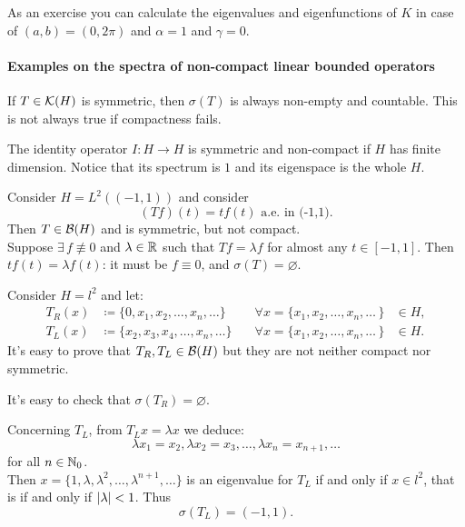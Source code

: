 As an exercise you can calculate the eigenvalues and eigenfunctions of $K$ in case of $(a,b)=(0, 2\pi)$ and $\alpha = 1$ and $\gamma = 0$.


\paragraph{Examples on the spectra of non-compact linear bounded operators}
If $T \in \mathcal K(H)$ is symmetric, then $\sigma(T)$ is always non-empty and countable. This is not always true if compactness fails.

\begin{exam}
	The identity operator $I:H \to H$ is symmetric and non-compact if $H$ has finite dimension. Notice that its spectrum is ${1}$ and its eigenspace is the whole $H$.
\end{exam}

\begin{exam}
	Consider $H = L^2((-1,1))$ and consider
	$$
	(Tf)(t)
	= tf(t)
	\text { a.e. in (-1,1)}
	.
	$$
	Then $T \in \mathcal B(H)$ and is symmetric, but not compact. \\
	Suppose $\exists \, f \not \equiv 0$ and $\lambda \in \mathbb R$ such that $Tf = \lambda f$ for almost any $t \in [-1,1]$. Then $tf(t) = \lambda f(t)$: it must be $f \equiv 0$, and $\sigma(T) = \varnothing$.
\end{exam}

\begin{exam}
	Consider $H=l^2$ and let:
	\begin{align*}
		T_R(x) 
		&\coloneqq \{0, x_1, x_2, \ldots, x_n, \ldots \} 
		\quad & \forall x
		=\{x_1, x_2, \ldots, x_n, \ldots \, \}&\in H
		, \\
		T_L(x) 
		&\coloneqq \{x_2, x_3, x_4, \ldots, x_n, \ldots \} 
		\quad & \forall x
		=\{x_1, x_2, \ldots, x_n, \ldots \, \}&\in H
		.
	\end{align*}
	It's easy to prove that $T_R, T_L \in \mathcal B(H)$ but they are not neither compact nor symmetric.
	
	It's easy to check that $\sigma(T_R) = \varnothing$.
	
	Concerning $T_L$, from $T_Lx = \lambda x$ we deduce:
	$$
	\lambda x_1
	= x_2
	,
	\lambda x_2
	= x_3
	,
	\ldots
	,
	\lambda x_n
	= x_{n+1}
	,
	\ldots
	$$
	for all $n \in \mathbb N_0$.\\
	Then $x= \{1, \lambda, \lambda^2, \ldots, \lambda^{n+1}, \ldots \}$ is an eigenvalue for $T_L$ if and only if $x\in l^2$, that is if and only if $\left\lvert\lambda\right\rvert < 1$.
	Thus
	$$
	\sigma(T_L)
	= (-1, 1)
	.
	$$
\end{exam}

